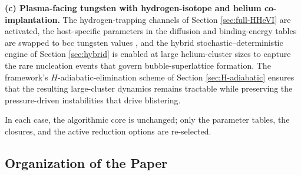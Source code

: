 \documentclass[sn-mathphys-ay,Numbered]{sn-jnl}
\begin{document}
\textbf{(c) Plasma-facing tungsten with hydrogen-isotope and helium
co-implantation.} The hydrogen-trapping channels of
Section \ref{sec:full-HHeVI} are activated, the host-specific
parameters in the diffusion and binding-energy tables are swapped
to bcc tungsten values \citep{Becquart2014,Hayward2013,Ferreira2024},
and the hybrid stochastic--deterministic engine of
Section \ref{sec:hybrid} is enabled at large helium-cluster sizes to
capture the rare nucleation events that govern bubble-superlattice
formation. The framework's $H$-adiabatic-elimination scheme of
Section \ref{sec:H-adiabatic} ensures that the resulting
large-cluster dynamics remains tractable while preserving the
pressure-driven instabilities that drive blistering.

In each case, the algorithmic core is unchanged; only the parameter
tables, the closures, and the active reduction options are
re-selected.

\subsection*{Organization of the Paper}
\end{document}
